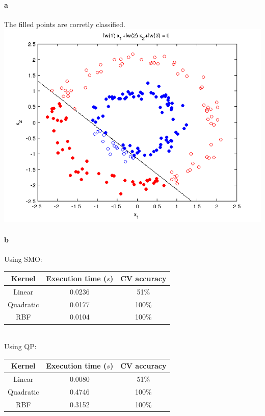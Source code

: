 \documentclass{article}
\begin{document}
\paragraph{a}
The filled points are corretly classified.\\
\includegraphics[scale = 0.7]{pics/plot22.png}

\paragraph{b}

Using SMO:

\begin{tabular}{c | c | c}
  Kernel & Execution time ($s$)& CV accuracy\\
  \hline
  Linear & 0.0236 & 51\%\\
  Quadratic & 0.0177 & 100\%\\
  RBF & 0.0104 & 100\%
\end{tabular}\\

Using QP:

\begin{tabular}{c | c | c}
  Kernel & Execution time ($s$)& CV accuracy\\
  \hline
  Linear & 0.0080 & 51\%\\
  Quadratic & 0.4746 & 100\%\\
  RBF & 0.3152 & 100\%
\end{tabular}
\end{document}
